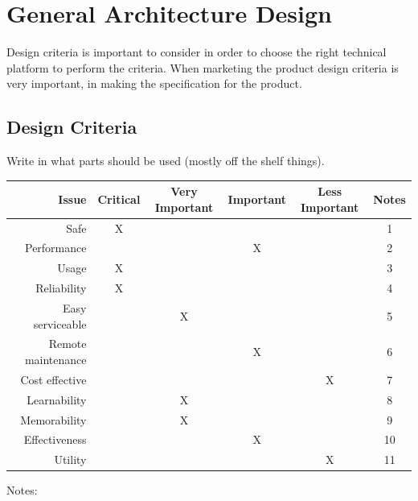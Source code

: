\section{General Architecture Design}
Design criteria is important to consider in order to choose the right technical platform to perform the criteria. When marketing the product design criteria is very important, in making the specification for the product.
\subsection{Design Criteria}
Write in what parts should be used (mostly off the shelf things).
\begin{table}[H]
	\begin{tabular}{| r | c | c | c | c | c |}
	\hline
		Issue 					& Critical 	& Very Important 	& Important	& Less Important	& Notes \\ \hline
		Safe					& X 		& ~ 				& ~			& ~ 				& 1 \\ \hline
		Performance 			& ~			& ~ 				& X 		& ~ 				& 2 \\ \hline
		Usage 					& X 		& ~ 				& ~ 		& ~ 				& 3 \\ \hline
		Reliability 			& X 		& ~ 				& ~ 		& ~ 				& 4 \\ \hline
		Easy serviceable 		& ~ 		& X 				& ~ 		& ~ 				& 5 \\ \hline
		Remote maintenance 		& ~ 		& ~ 				& X 		& ~ 				& 6 \\ \hline
		Cost effective 			& ~ 		& ~ 				& ~ 		& X 				& 7 \\ \hline
		Learnability			& ~ 		& X 				& ~ 		& ~ 				& 8 \\ \hline
		Memorability			& ~ 		& X 				& ~ 		& ~ 				& 9 \\ \hline
		Effectiveness			& ~ 		& ~ 				& X 		& ~ 				& 10 \\ \hline
		Utility					& ~ 		& ~ 				& ~ 		& X 				& 11 \\ \hline
	\end{tabular}
	\end{table}
Notes:
